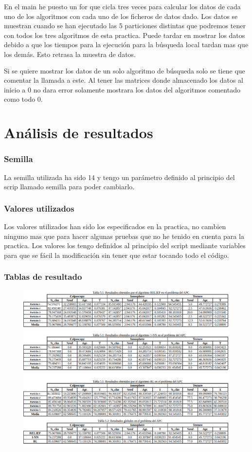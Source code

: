 \documentclass[titlepage]{article}
\begin{document}
	En el main he puesto un for que cicla tres veces para calcular los datos de cada uno de los algoritmos con cada uno de los ficheros de datos dado. Los datos se muestran cuando se han ejecutado las 5 particiones distintas que podremos tener con todos los tres algoritmos de esta practica. Puede tardar en mostrar los datos debido a que los tiempos para la ejecución para la búsqueda local tardan mas que los demás. Esto retrasa la muestra de datos.
	
	Si se quiere mostrar los datos de un solo algoritmo de búsqueda solo se tiene que comentar la llamada a este. Al tener las matrices donde almacenado los datos al inicio a 0 no dara error solamente mostrara los datos del algoritmos comentado como todo 0.
	\section{Análisis de resultados}
	\subsubsection{Semilla}
	La semilla utilizada ha sido 14 y tengo un parámetro definido al principio del scrip llamado semilla para poder cambiarlo.
	
	\subsubsection{Valores utilizados}	
	Los valores utilizados han sido los especificados en la practica, no cambien ninguno mas que para hacer algunas pruebas que no he tenido en cuenta para la practica. Los valores los tengo definidos al principio del script mediante variables para que se fácil la modificación sin tener que estar tocando todo el código.
	
	\subsubsection{Tablas de resultado}
	\newpage
	\begin{figure}
		\centering
		\includegraphics[width=1\linewidth]{screen3}
		\caption{}
		\label{fig:screen3}
	\end{figure}
	
\end{document}
